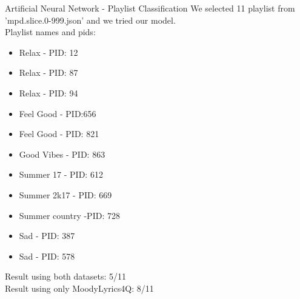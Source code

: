 \documentclass[xcolor=dvipsnames]{beamer}
\begin{document}
\begin{frame}{Artificial Neural Network - Playlist Classification}
We selected 11 playlist from 'mpd.slice.0-999.json' and we tried our model. \\
Playlist names and pids: 
\begin{itemize}
\item Relax - PID: 12
\item Relax - PID: 87
\item Relax - PID: 94
\item Feel Good - PID:656
\item Feel Good - PID: 821
\item Good Vibes - PID: 863
\item Summer 17 - PID: 612
\item Summer 2k17 - PID: 669
\item Summer country -PID: 728
\item Sad - PID: 387
\item Sad - PID: 578
\end{itemize}
Result using both datasets: 5/11\\
Result using only MoodyLyrics4Q: 8/11\\
\end{frame} 
\end{document}
